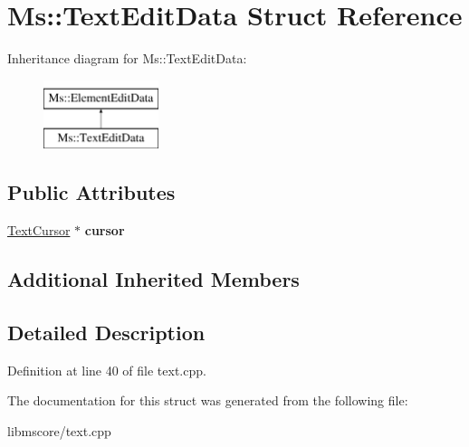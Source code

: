 \hypertarget{struct_ms_1_1_text_edit_data}{}\section{Ms\+:\+:Text\+Edit\+Data Struct Reference}
\label{struct_ms_1_1_text_edit_data}
Inheritance diagram for Ms\+:\+:Text\+Edit\+Data\+:\begin{figure}[H]
\begin{center}
\leavevmode
\includegraphics[height=2.000000cm]{struct_ms_1_1_text_edit_data}
\end{center}
\end{figure}
\subsection*{Public Attributes}
\begin{DoxyCompactItemize}
\item 
\mbox{\label{struct_ms_1_1_text_edit_data_af6dad0cead46291136d85cb40bcc9d65}} 
\hyperlink{class_ms_1_1_text_cursor}{Text\+Cursor} $\ast$ {\bfseries cursor}
\end{DoxyCompactItemize}
\subsection*{Additional Inherited Members}


\subsection{Detailed Description}


Definition at line 40 of file text.\+cpp.



The documentation for this struct was generated from the following file\+:\begin{DoxyCompactItemize}
\item 
libmscore/text.\+cpp\end{DoxyCompactItemize}
